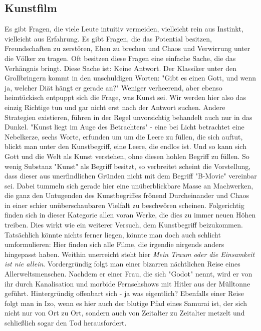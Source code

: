 \subsection{Kunstfilm}

Es gibt Fragen, die viele Leute intuitiv vermeiden, vielleicht rein aus
Instinkt, vielleicht aus Erfahrung. 
Es gibt Fragen, die das Potential besitzen, Freundschaften zu zerstören, Ehen zu
brechen und Chaos und Verwirrung unter die Völker zu tragen. 
Oft besitzen diese Fragen eine einfache Sache, die das Verhängnis bringt. Diese
Sache ist: Keine Antwort. 
Der Klassiker unter den Grollbringern kommt in den unschuldigen Worten: 
"Gibt es einen Gott, und wenn ja, welcher Diät hängt er gerade an?"
Weniger verheerend, aber ebenso heimtückisch entpuppt sich die Frage, was Kunst
sei. 
Wir werden hier also das einzig Richtige tun und gar nicht erst nach der Antwort
suchen. 
Andere Strategien existieren, führen in der Regel unvorsichtig behandelt auch
nur in das Dunkel. 
"Kunst liegt im Auge des Betrachters" - eine bei Licht betrachtet eine
Nebelkerze, sechs Worte, erfunden um um die Leere zu füllen, die sich auftut,
blickt man unter den Kunstbegriff, eine Leere, die endlos ist. 
Und so kann sich Gott und die Welt als Kunst verstehen, ohne diesen hohlen
Begriff zu füllen.
So wenig Substanz "Kunst" als Begriff besitzt, so verbreitet scheint die
Vorstellung, dass dieser aus unerfindlichen Gründen nicht mit dem Begriff
"B-Movie" vereinbar sei. 
Dabei tummeln sich gerade hier eine unüberblickbare Masse an Machwerken, die
ganz den Untugenden des Kunstbegriffes frönend Durcheinander und Chaos in einer schier
unüberschaubaren Vielfalt zu beschwören scheinen.
Folgerichtig finden sich in dieser Kategorie allen voran Werke, die dies zu
immer neuen Höhen treiben.
Dies wirkt wie ein weiterer Versuch, dem Kunstbegriff beizukommen. 
Tatsächlich könnte nichts ferner liegen, könnte man doch auch schlicht
umformulieren: 
Hier finden sich alle Filme, die irgendie nirgends anders
hingepasst haben.
Weithin unerreicht steht hier \emph{Mein Traum oder die Einsamkeit ist nie
allein}.
Vordergründig folgt man einer bizarren nächtlichen Reise eines
Allerweltsmenschen. Nachdem er einer Frau, die sich "Godot" nennt, wird er von
ihr durch Kanalisation und morbide Fernsehshows mit Hitler aus der Mülltonne
geführt. 
Hintergründig offenbart sich - ja was eigentlich?
Ebenfalls einer Reise folgt man in Izo, wenn es hier auch der blutige Pfad eines Samurai
ist, der sich nicht nur von Ort zu Ort, sondern auch von Zeitalter zu Zeitalter
metzelt und schließlich sogar den Tod herausfordert.
